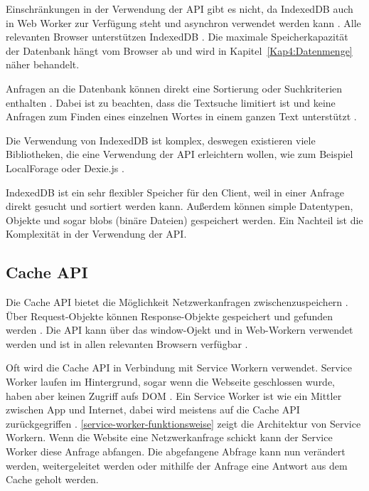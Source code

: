 Einschränkungen in der Verwendung der \ac{API} gibt es nicht, da IndexedDB auch in Web Worker zur Verfügung steht und asynchron verwendet werden kann \autocite{Hajian2019} \autocite{mdn-indexeddb}. Alle relevanten Browser unterstützen IndexedDB \autocite{mdn-indexeddb-api}. Die maximale Speicherkapazität der Datenbank hängt vom Browser ab und wird in Kapitel~\ref{Kap4:Datenmenge} näher behandelt.

Anfragen an die Datenbank können direkt eine Sortierung oder Suchkriterien enthalten \autocite{mdn-indexeddb}. Dabei ist zu beachten, dass die Textsuche limitiert ist und keine Anfragen zum Finden eines einzelnen Wortes in einem ganzen Text unterstützt \autocite{mdn-indexeddb}. 

Die Verwendung von IndexedDB ist komplex, deswegen existieren viele Bibliotheken, die eine Verwendung der \ac{API} erleichtern wollen, wie zum Beispiel LocalForage oder Dexie.js \autocite{Hajian2019} \autocite{mdn-indexeddb}.

IndexedDB ist ein sehr flexibler Speicher für den Client, weil in einer Anfrage direkt gesucht und sortiert werden kann. Außerdem können simple Datentypen, Objekte und sogar \acp{blob} (binäre Dateien) gespeichert werden. Ein Nachteil ist die Komplexität in der Verwendung der \ac{API}.

\subsection{Cache API}
Die Cache \ac{API} bietet die Möglichkeit Netzwerkanfragen zwischenzuspeichern \autocite{mdn-cache-api}. Über Request-Objekte können Response-Objekte gespeichert und gefunden werden \autocite{mdn-cache-api}. Die \ac{API} kann über das window-Ojekt und in Web-Workern verwendet werden und ist in allen relevanten Browsern verfügbar \autocite{mdn-cache-api}.

Oft wird die Cache \ac{API} in Verbindung mit Service Workern verwendet. Service Worker laufen im Hintergrund, sogar wenn die Webseite geschlossen wurde, haben aber keinen Zugriff aufs DOM \autocite{Sheppard2017}. Ein Service Worker ist wie ein Mittler zwischen App und Internet, dabei wird meistens auf die Cache API zurückgegriffen \autocite{Sheppard2017}. \autoref{service-worker-funktionsweise} zeigt die Architektur von Service Workern. Wenn die Website eine Netzwerkanfrage schickt kann der Service Worker diese Anfrage abfangen. Die abgefangene Abfrage kann nun verändert werden, weitergeleitet werden oder mithilfe der Anfrage eine Antwort aus dem Cache geholt werden.

